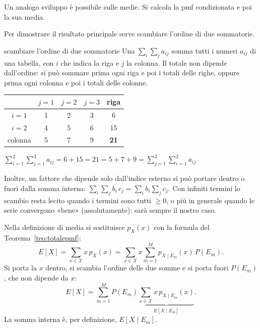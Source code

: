 Un analogo sviluppo è possibile sulle medie. Si calcola la pmf condizionata e poi la sua media.


Per dimostrare il risultato principale serve scambiare l'ordine di due sommatorie.

\begin{richiamo}{scambiare l'ordine di due sommatorie}
Una  $\sum_{i} \sum_{j} a_{ij}$ somma tutti i numeri $a_{ij}$ di una tabella, con $i$ che indica la
riga e $j$ la colonna. Il totale non dipende dall'ordine: si può sommare prima ogni riga e poi i totali delle righe,
oppure prima ogni colonna e poi i totali delle colonne.
\begin{center}
\renewcommand{\arraystretch}{1.25}
\begin{tabular}{c|ccc|c}
         & $j = 1$ & $j = 2$ & $j = 3$ & riga \\ \hline
  $i = 1$ & 1 & 2 & 3 & 6 \\
  $i = 2$ & 4 & 5 & 6 & 15 \\ \hline
  colonna & 5 & 7 & 9 & \textbf{21}
\end{tabular}
\qquad
$\displaystyle \sum_{i=1}^{2} \sum_{j=1}^{3} a_{ij} = 6 + 15 = 21 = 5 + 7 + 9 = \sum_{j=1}^{3} \sum_{i=1}^{2} a_{ij}$
\end{center}
Inoltre, un fattore che dipende solo dall'indice esterno si può portare dentro o fuori dalla somma interna:
$\sum_i \sum_j b_i\, c_j = \sum_i b_i \sum_j c_j$. Con infiniti termini lo scambio resta lecito quando i termini sono
tutti $\geq 0$, o più in generale quando le serie convergono «bene» (assolutamente): sarà sempre il nostro caso.
\end{richiamo}


\begin{dimostrazione}
 Nella definizione di media si sostituisce $p_X(x)$ con la formula del
Teorema~\ref{teo:totalepmf}:
\[ E[X] = \sum_{x \in \mathcal{X}} x\, p_X(x) = \sum_{x \in \mathcal{X}} x \sum_{m=1}^{M} p_{X \mid E_m}(x)\, P(E_m) . \]
 Si porta la $x$ dentro, si scambia l'ordine delle due somme e si porta fuori $P(E_m)$, che
non dipende da $x$:
\[ E[X] = \sum_{m=1}^{M} P(E_m) \underbrace{\sum_{x \in \mathcal{X}} x\, p_{X \mid E_m}(x)}_{E[X \mid E_m]} . \]
 La somma interna è, per definizione, $E[X \mid E_m]$.
\end{dimostrazione}

